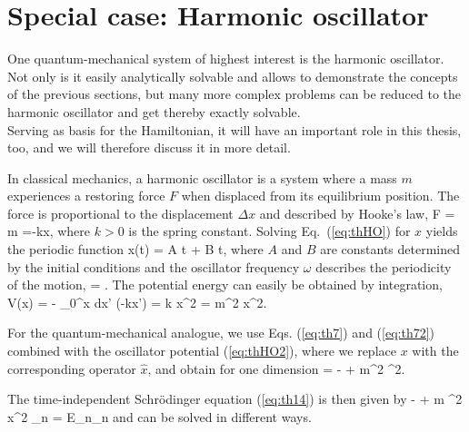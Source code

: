\section{Special case: Harmonic oscillator}
\label{sec:HO}
One quantum-mechanical system of highest interest is the harmonic oscillator. Not only is it easily analytically solvable and allows to demonstrate the concepts of the previous sections, but many more complex problems can be reduced to the harmonic oscillator and get thereby exactly solvable. \\
Serving as basis for the Hamiltonian, it will have an important role in this thesis, too, and we will therefore discuss it in more detail.

In classical mechanics, a harmonic oscillator is a system where a mass $m$ experiences a restoring force $F$ when displaced from its equilibrium position. The force is proportional to the displacement $\Delta x$ and described by Hooke's law,
\be
F = m  =-k\Delta x,
\label{eq:thHO}
\ee
where $k>0$ is the spring constant. Solving Eq.~(\ref{eq:thHO}) for $x$ yields the periodic function
\be 
x(t) = A \sin \omega t + B \cos \omega t,
\ee
where $A$ and $B$ are constants determined by the initial conditions and the oscillator frequency $\omega$ describes the periodicity of the motion,
\be 
\omega = .
\ee
The potential energy can easily be obtained by integration,
\be 
V(x) = - \int_0^x dx'\; (-kx') = k x^2 = m\omega^2 x^2.
\label{eq:thHO2}
\ee

For the quantum-mechanical analogue, we use Eqs. (\ref{eq:th7}) and (\ref{eq:th72}) combined with the oscillator potential (\ref{eq:thHO2}), where we replace $x$ with the corresponding operator $\hat{x}$, and obtain for one dimension
\be 
{} = -   + m\omega^2 ^2.
\label{eq:HOham}
\ee

The time-independent Schr\"odinger equation (\ref{eq:th14}) is then given by
\be 
\lb -  +  m \omega^2 x^2 \rb \psi_n = E_n\psi_n
\ee
and can be solved in different ways.

